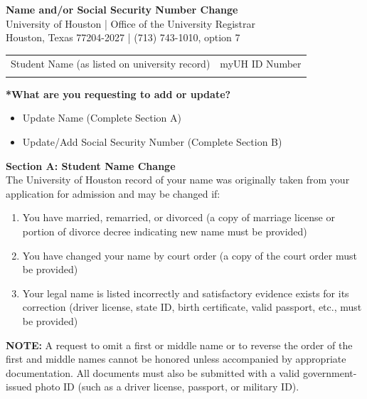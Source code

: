 \documentclass[12pt]{article}
\begin{document}
\begin{center}
\textbf{Name and/or Social Security Number Change}\\
University of Houston | Office of the University Registrar\\
Houston, Texas 77204-2027 | (713) 743-1010, option 7
\end{center}

\vspace{1em}
\noindent\begin{tabular}{@{}p{}p{}@{}}
Student Name (as listed on university record) & myUH ID Number\\
\underline{\hspace{5cm}} & \underline{\hspace{5cm}}\\
\end{tabular}

\vspace{1em}
\noindent\textbf{*What are you requesting to add or update?}\\
\begin{itemize}[leftmargin=0.7cm, label=$\square$]
\item Update Name (Complete Section A)
\item Update/Add Social Security Number (Complete Section B)
\end{itemize}

\vspace{1em}
\noindent\textbf{Section A: Student Name Change}\\
The University of Houston record of your name was originally taken from your application for admission and may be changed if:
\begin{enumerate}
\item You have married, remarried, or divorced (a copy of marriage license or portion of divorce decree indicating new name must be provided)
\item You have changed your name by court order (a copy of the court order must be provided)
\item Your legal name is listed incorrectly and satisfactory evidence exists for its correction (driver license, state ID, birth certificate, valid passport, etc., must be provided)
\end{enumerate}

\noindent\textbf{NOTE:} A request to omit a first or middle name or to reverse the order of the first and middle names cannot be honored unless accompanied by appropriate documentation. All documents must also be submitted with a valid government-issued photo ID (such as a driver license, passport, or military ID).
\end{document}
